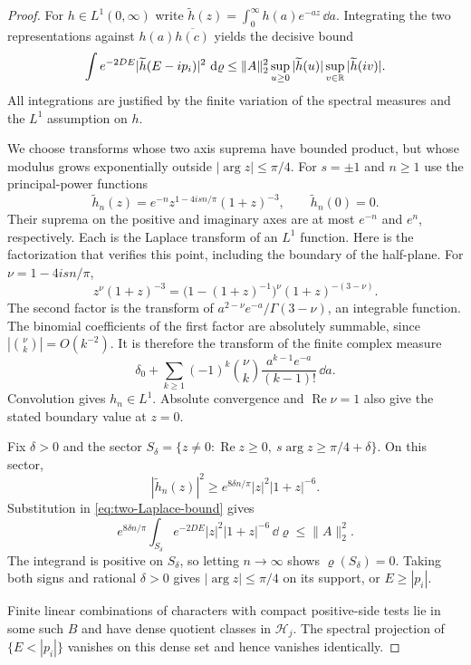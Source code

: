 \begin{proof}
For $h\in L^1(0,\infty)$ write
$\widetilde h(z)=\int_0^\infty h(a)e^{-az}\,\dd a$.
Integrating the two representations against
$h(a)\overline{h(c)}$ yields the decisive bound
\begin{equation}\label{eq:two-Laplace-bound}
 \int e^{-2DE}|\widetilde h(E-ip_i)|^2\,\,\mathrm d\varrho
 \le\|A\|_2^2
 \sup_{u\ge0}|\widetilde h(u)|
 \sup_{v\in\mathbb R}|\widetilde h(iv)|.
\end{equation}
All integrations are justified by the finite variation of the
spectral measures and the $L^1$ assumption on $h$.

We choose transforms whose two axis suprema have bounded product,
but whose modulus grows exponentially outside $|\arg z|\le\pi/4$.
For $s=\pm1$ and $n\ge1$ use the principal-power functions
\begin{equation}\label{eq:cone-Laplace-tests}
 \widetilde h_n(z)
 =e^{-n}z^{1-4isn/\pi}(1+z)^{-3},\qquad
 \widetilde h_n(0)=0.
\end{equation}
Their suprema on the positive and imaginary axes are at most
$e^{-n}$ and $e^n$, respectively. Each is the Laplace transform of
an $L^1$ function. Here is the factorization that verifies this
point, including the boundary of the half-plane. For
$\nu=1-4isn/\pi$,
\[
 z^\nu(1+z)^{-3}
 =\bigl(1-(1+z)^{-1}\bigr)^\nu(1+z)^{-(3-\nu)}.
\]
The second factor is the transform of
$a^{2-\nu}e^{-a}/\Gamma(3-\nu)$, an integrable function.
The binomial coefficients of the first factor are absolutely
summable, since $|\binom\nu k|=O(k^{-2})$. It is therefore the
transform of the finite complex measure
\[
 \delta_0+
 \sum_{k\ge1}(-1)^k\binom\nu k
 \frac{a^{k-1}e^{-a}}{(k-1)!}\,\dd a.
\]
Convolution gives $h_n\in L^1$. Absolute convergence and
$\operatorname{Re}\nu=1$ also give the stated boundary value at
$z=0$.

Fix $\delta>0$ and the sector
$S_\delta=\{z\ne0:\operatorname{Re}z\ge0,
\ s\arg z\ge\pi/4+\delta\}$. On this sector,
\[
 |\widetilde h_n(z)|^2
 \ge e^{8\delta n/\pi}|z|^2|1+z|^{-6}.
\]
Substitution in \eqref{eq:two-Laplace-bound} gives
\[
 e^{8\delta n/\pi}
 \int_{S_\delta}e^{-2DE}|z|^2|1+z|^{-6}\,\dd\varrho
 \le\|A\|_2^2.
\]
The integrand is positive on $S_\delta$, so letting $n\to\infty$
shows $\varrho(S_\delta)=0$. Taking both signs and rational
$\delta>0$ gives $|\arg z|\le\pi/4$ on its support, or
$E\ge|p_i|$.

Finite linear combinations of characters with compact positive-side
tests lie in some such $B$ and have dense quotient classes in
$\mathcal H_j$. The spectral projection of $\{E<|p_i|\}$
vanishes on this dense set and hence vanishes identically.
\end{proof}


